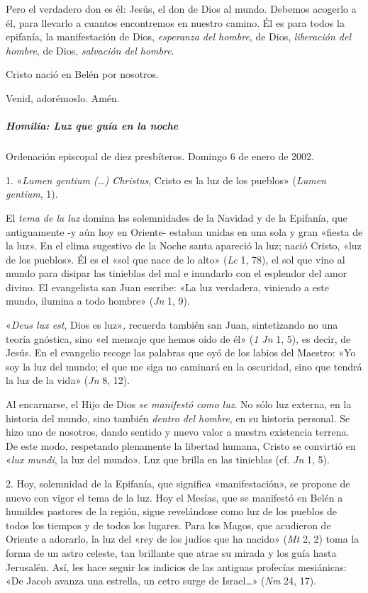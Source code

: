 \documentclass[]{article}
\let\oldsubparagraph\subparagraph
\renewcommand{\subparagraph}[1]{\oldsubparagraph{#1}\mbox{}}
\begin{document}
Pero el verdadero don es él: Jesús, el don de Dios al mundo. Debemos
acogerlo a él, para llevarlo a cuantos encontremos en nuestro camino. Él
es para todos la epifanía, la manifestación de Dios, \emph{esperanza del
hombre}, de Dios, \emph{liberación del hombre}, de Dios, \emph{salvación
del hombre}.

Cristo nació en Belén por nosotros.

Venid, adorémoslo. Amén.

\subparagraph{Homilía: Luz que guía en la
noche}\label{homiluxeda-luz-que-guuxeda-en-la-noche}

Ordenación episcopal de diez presbíteros. Domingo 6 de enero de 2002.

1. «\emph{Lumen gentium (\ldots{}) Christus}, Cristo es la luz de los
pueblos» (\emph{Lumen gentium}, 1).

El \emph{tema de la luz} domina las solemnidades de la Navidad y de la
Epifanía, que antiguamente -y aún hoy en Oriente- estaban unidas en una
sola y gran «fiesta de la luz». En el clima sugestivo de la Noche santa
apareció la luz; nació Cristo, «luz de los pueblos». Él es el «sol que
nace de lo alto» (\emph{Lc} 1, 78), el sol que vino al mundo para
disipar las tinieblas del mal e inundarlo con el esplendor del amor
divino. El evangelista san Juan escribe: «La luz verdadera, viniendo a
este mundo, ilumina a todo hombre» (\emph{Jn} 1, 9).

«\emph{Deus lux est}, Dios es luz»\emph{,} recuerda también san Juan,
sintetizando no una teoría gnóstica, sino «el mensaje que hemos oído de
él» (\emph{1 Jn} 1, 5), es decir, de Jesús. En el evangelio recoge las
palabras que oyó de los labios del Maestro: «Yo soy la luz del mundo; el
que me siga no caminará en la oscuridad, sino que tendrá la luz de la
vida» (\emph{Jn} 8, 12).

Al encarnarse, el Hijo de Dios \emph{se manifestó como luz}. No sólo luz
externa, en la historia del mundo, sino también \emph{dentro del
hombre}, en su historia personal. Se hizo uno de nosotros, dando sentido
y nuevo valor a nuestra existencia terrena. De este modo, respetando
plenamente la libertad humana, Cristo se convirtió en «\emph{lux mundi},
la luz del mundo». Luz que brilla en las tinieblas (cf. \emph{Jn} 1, 5).

2. Hoy, solemnidad de la Epifanía, que significa «manifestación», se
propone de nuevo con vigor el tema de la luz. Hoy el Mesías, que se
manifestó en Belén a humildes pastores de la región, sigue revelándose
como luz de los pueblos de todos los tiempos y de todos los lugares.
Para los Magos, que acudieron de Oriente a adorarlo, la luz del «rey de
los judíos que ha nacido» (\emph{Mt} 2, 2) toma la forma de un astro
celeste, tan brillante que atrae su mirada y los guía hasta Jerusalén.
Así, les hace seguir los indicios de las antiguas profecías mesiánicas:
«De Jacob avanza una estrella, un cetro surge de Israel\ldots{}»
(\emph{Nm} 24, 17).
\end{document}
